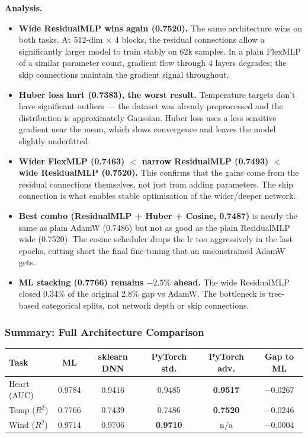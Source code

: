 \documentclass[11pt,a4paper]{article}
\begin{document}
\textbf{Analysis.}
\begin{itemize}[leftmargin=1.2em,itemsep=0.15em]
    \item \textbf{Wide ResidualMLP wins again (0.7520).} The same architecture wins on both tasks. At 512-dim $\times$ 4 blocks,
    the residual connections allow a significantly larger model to train stably on 62k samples. In a plain FlexMLP of a similar
    parameter count, gradient flow through 4 layers degrades; the skip connections maintain the gradient signal throughout.
    \item \textbf{Huber loss hurt (0.7383), the worst result.} Temperature targets don't have significant outliers --- the
    dataset was already preprocessed and the distribution is approximately Gaussian. Huber loss uses a less sensitive gradient
    near the mean, which slows convergence and leaves the model slightly underfitted.
    \item \textbf{Wider FlexMLP (0.7463) $<$ narrow ResidualMLP (0.7493) $<$ wide ResidualMLP (0.7520).} This confirms that the
    gains come from the residual connections themselves, not just from adding parameters. The skip connection is what
    enables stable optimisation of the wider/deeper network.
    \item \textbf{Best combo (ResidualMLP + Huber + Cosine, 0.7487)} is nearly the same as plain AdamW (0.7486) but not as
    good as the plain ResidualMLP wide (0.7520). The cosine scheduler drops the lr too aggressively in the last epochs,
    cutting short the final fine-tuning that an unconstrained AdamW gets.
    \item \textbf{ML stacking (0.7766) remains $-2.5\%$ ahead.} The wide ResidualMLP closed 0.34\% of the original 2.8\% gap
    vs AdamW. The bottleneck is tree-based categorical splits, not network depth or skip connections.
\end{itemize}

\subsubsection*{Summary: Full Architecture Comparison}

\begin{center}
\small
\begin{tabular}{lccccc}
\toprule
\textbf{Task} & \textbf{ML} & \textbf{sklearn DNN} & \textbf{PyTorch std.} & \textbf{PyTorch adv.} & \textbf{Gap to ML} \\
\midrule
Heart (AUC)  & 0.9784 & 0.9416 & 0.9485 & \textbf{0.9517} & $-$0.0267 \\
Temp ($R^2$) & 0.7766 & 0.7439 & 0.7486 & \textbf{0.7520} & $-$0.0246 \\
Wind ($R^2$) & 0.9714 & 0.9706 & \textbf{0.9710} & n/a & $-$0.0004 \\
\bottomrule
\end{tabular}
\end{center}
\end{document}
